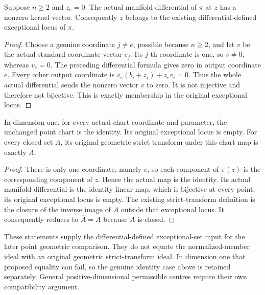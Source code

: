 \begin{theorem}
\label{hir:actual-point-blowup-hyperplane-exceptional}
\leanok
Suppose $n\ge2$ and $z_e=0$. The actual manifold differential of $\pi$
at $z$ has a nonzero kernel vector. Consequently $z$ belongs to the
existing differential-defined exceptional locus of $\pi$.
\end{theorem}
\begin{proof}
Choose a genuine coordinate $j\ne e$, possible because $n\ge2$, and let
$v$ be the actual standard coordinate vector $e_j$. Its $j$-th coordinate
is one, so $v\ne0$, whereas $v_e=0$. The preceding differential formula
gives zero in output coordinate $e$. Every other output coordinate is
$v_e(b_i+z_i)+z_e v_i=0$. Thus the whole actual differential sends the
nonzero vector $v$ to zero. It is not injective and therefore not
bijective. This is exactly membership in the original exceptional locus.
\end{proof}

\begin{theorem}
\label{hir:actual-point-blowup-one-dimensional-identity}
\leanok
In dimension one, for every actual chart coordinate and parameter, the
unchanged point chart is the identity. Its original exceptional locus
is empty. For every closed set $A$, its original geometric strict
transform under this chart map is exactly $A$.
\end{theorem}
\begin{proof}
There is only one coordinate, namely $e$, so each component of $\pi(z)$
is the corresponding component of $z$. Hence the actual map is the
identity. Its actual manifold differential is the identity linear map,
which is bijective at every point; its original exceptional locus is
empty. The existing strict-transform definition is the closure of the
inverse image of $A$ outside that exceptional locus. It consequently
reduces to $\overline A=A$ because $A$ is closed.
\end{proof}

These statements supply the differential-defined exceptional-set input
for the later point geometric comparison. They do not equate the
normalized-member ideal with an original geometric strict-transform
ideal. In dimension one that proposed equality can fail, so the genuine
identity case above is retained separately. General positive-dimensional
permissible centres require their own compatibility argument.
